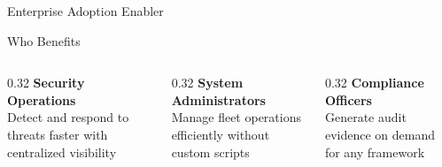 \begin{frame}{Enterprise Adoption Enabler}
  \begin{exampleblock}{Who Benefits}
    \scriptsize
    \begin{columns}[T]
      \begin{column}{0.32\textwidth}
        \textbf{Security Operations}\\
        \tiny Detect and respond to threats faster with centralized visibility
      \end{column}
      \begin{column}{0.32\textwidth}
        \textbf{System Administrators}\\
        \tiny Manage fleet operations efficiently without custom scripts
      \end{column}
      \begin{column}{0.32\textwidth}
        \textbf{Compliance Officers}\\
        \tiny Generate audit evidence on demand for any framework
      \end{column}
    \end{columns}
  \end{exampleblock}
\end{frame}
